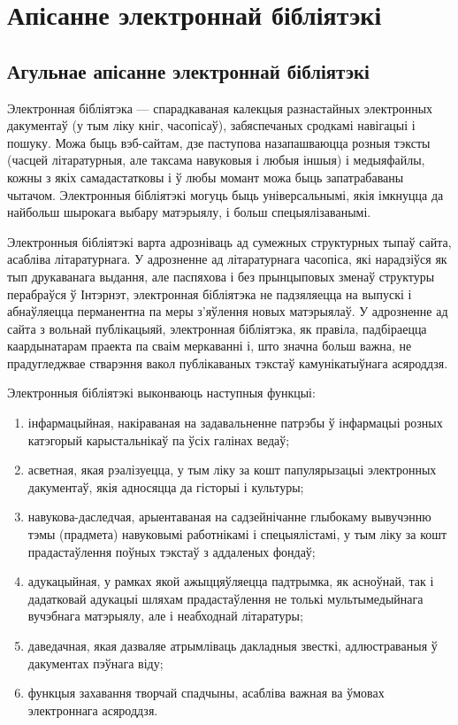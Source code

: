 \section{Апісанне электроннай бібліятэкі}

\subsection{Агульнае апісанне электроннай бібліятэкі}

Электронная бібліятэка --- спарадкаваная калекцыя разнастайных электронных дакументаў (у тым ліку кніг, часопісаў), забяспечаных сродкамі навігацыі і пошуку. Можа быць вэб-сайтам, дзе паступова назапашваюцца розныя тэксты (часцей літаратурныя, але таксама навуковыя і любыя іншыя) і медыяфайлы, кожны з якіх самадастатковы і ў любы момант можа быць запатрабаваны чытачом. Электронныя бібліятэкі могуць быць універсальнымі, якія імкнуцца да найбольш шырокага выбару матэрыялу, і больш спецыялізаванымі.

Электронныя бібліятэкі варта адрозніваць ад сумежных структурных тыпаў сайта, асабліва літаратурнага. У адрозненне ад літаратурнага часопіса, які нарадзіўся як тып друкаванага выдання, але паспяхова і без прынцыповых зменаў структуры перабраўся ў Інтэрнэт, электронная бібліятэка не падзяляецца на выпускі і абнаўляецца перманентна па меры з'яўлення новых матэрыялаў. У адрозненне ад сайта з вольнай публікацыяй, электронная бібліятэка, як правіла, падбіраецца каардынатарам праекта па сваім меркаванні і, што значна больш важна, не прадугледжвае стварэння вакол публікаваных тэкстаў камунікатыўнага асяроддзя.

Электронныя бібліятэкі выконваюць наступныя функцыі:
\begin{enumerate}
    \item інфармацыйная, накіраваная на задавальненне патрэбы ў інфармацыі розных катэгорый карыстальнікаў па ўсіх галінах ведаў;
    \item асветная, якая рэалізуецца, у тым ліку за кошт папулярызацыі электронных дакументаў, якія адносяцца да гісторыі і культуры;
    \item навукова-даследчая, арыентаваная на садзейнічанне глыбокаму вывучэнню тэмы (прадмета) навуковымі работнікамі і спецыялістамі, у тым ліку за кошт прадастаўлення поўных тэкстаў з аддаленых фондаў;
    \item адукацыйная, у рамках якой ажыццяўляецца падтрымка, як асноўнай, так і дадатковай адукацыі шляхам прадастаўлення не толькі мультымедыйнага вучэбнага матэрыялу, але і неабходнай літаратуры;
    \item даведачная, якая дазваляе атрымліваць дакладныя звесткі, адлюстраваныя ў дакументах пэўнага віду;
    \item функцыя захавання творчай спадчыны, асабліва важная ва ўмовах электроннага асяроддзя.
\end{enumerate}


